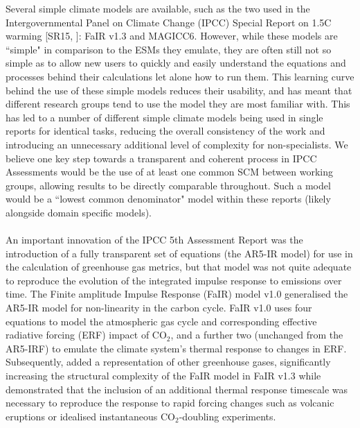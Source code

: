 \documentclass[gmd, manuscript]{copernicus}
\begin{document}
Several simple climate models are available, such as the two used in the Intergovernmental Panel on Climate Change (IPCC) Special Report on 1.5\textdegree C warming [SR15, \cite{IPCC2018}]: FaIR v1.3 and MAGICC6. However, while these models are ``simple" in comparison to the ESMs they emulate, they are often still not so simple as to allow new users to quickly and easily understand the equations and processes behind their calculations let alone how to run them. This learning curve behind the use of these simple models reduces their usability, and has meant that different research groups tend to use the model they are most familiar with. This has led to a number of different simple climate models being used in single reports for identical tasks, reducing the overall consistency of the work and introducing an unnecessary additional level of complexity for non-specialists. We believe one key step towards a transparent and coherent process in IPCC Assessments would be the use of at least one common SCM between working groups, allowing results to be directly comparable throughout. Such a model would be a ``lowest common denominator" model within these reports (likely alongside domain specific models).\\\\
An important innovation of the IPCC 5th Assessment Report \citep{Myhre2013a} was the introduction of a fully transparent set of equations (the AR5-IR model) for use in the calculation of greenhouse gas metrics, but that model was not quite adequate to reproduce the evolution of the integrated impulse response to emissions over time. The Finite amplitude Impulse Response (FaIR) model v1.0 \citep{Millar2016} generalised the AR5-IR model for non-linearity in the carbon cycle. FaIR v1.0 uses four equations to model the atmospheric gas cycle and corresponding effective radiative forcing (ERF) impact of CO$_2$, and a further two (unchanged from the AR5-IRF) to emulate the climate system's thermal response to changes in ERF. Subsequently, \cite{Smith2017} added a representation of other greenhouse gases, significantly increasing the structural complexity of the FaIR model in FaIR v1.3 while \citet{Tsutsui2017} demonstrated that the inclusion of an additional thermal response timescale was necessary to reproduce the response to rapid forcing changes such as volcanic eruptions or idealised instantaneous CO$_2$-doubling experiments.\\\\
\end{document}
